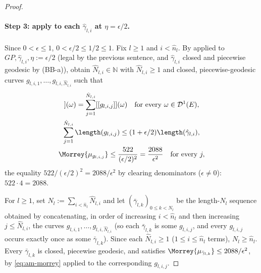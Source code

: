 \begin{proof}
  \paragraph{Step 3: apply  to each $\hat\gamma_{l,i}$ at $\eta=\epsilon/2$.}
  Since $0<\epsilon\le1$, $0<\epsilon/2\le1/2\le1$. Fix $l\ge1$ and $i<\hat n_l$. By
   applied to $GP,\hat\gamma_{l,i},\eta:=\epsilon/2$ (legal by the previous
  sentence, and $\hat\gamma_{l,i}$ closed and piecewise geodesic by (BB-a)), obtain
  $\hat N_{l,i}\in\mathbb N$ with $\hat N_{l,i}\ge1$ and closed, piecewise-geodesic curves
  $g_{l,i,1},\dots,g_{l,i,\hat N_{l,i}}$ such that
  \begin{gather}
    [[\hat\gamma_{l,i}]](\omega) = \sum_{j=1}^{\hat N_{l,i}} [[g_{l,i,j}]](\omega)
      \quad\text{for every }\omega\in\mathcal D^1(E)
      \label{eq:am-cur}
      ,
      \\
    \sum_{j=1}^{\hat N_{l,i}}\length(g_{l,i,j}) \le (1+\epsilon/2)\length(\hat\gamma_{l,i})
      \label{eq:am-len}
      ,
      \\
    \Morrey{\mu_{g_{l,i,j}}} \le \frac{522}{(\epsilon/2)^2} = \frac{2088}{\epsilon^2}
      \quad\text{for every }j
      \label{eq:am-morrey}
      ,
  \end{gather}
  the equality $522/(\epsilon/2)^2=2088/\epsilon^2$ by clearing denominators ($\epsilon\ne0$):
  $522\cdot4=2088$.

  For $l\ge1$, set $N_l:=\sum_{i<\hat n_l}\hat N_{l,i}$ and let
  $(\bar\gamma_{l,k})_{0\le k<N_l}$ be the length-$N_l$ sequence obtained by concatenating, in
  order of increasing $i<\hat n_l$ and then increasing $j\le\hat N_{l,i}$, the curves
  $g_{l,i,1},\dots,g_{l,i,\hat N_{l,i}}$ (so each $\bar\gamma_{l,k}$ is some $g_{l,i,j}$, and every
  $g_{l,i,j}$ occurs exactly once as some $\bar\gamma_{l,k}$). Since each $\hat N_{l,i}\ge1$
  ($1\le i\le\hat n_l$ terms), $N_l\ge\hat n_l$. Every $\bar\gamma_{l,k}$ is closed, piecewise
  geodesic, and satisfies $\Morrey{\mu_{\bar\gamma_{l,k}}}\le2088/\epsilon^2$, by
  \eqref{eq:am-morrey} applied to the corresponding $g_{l,i,j}$.


\end{proof}
